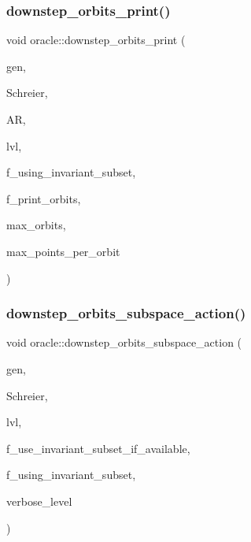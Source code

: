 \subsubsection{\texorpdfstring{downstep\+\_\+orbits\+\_\+print()}{downstep\_orbits\_print()}}
{\footnotesize\ttfamily void oracle\+::downstep\+\_\+orbits\+\_\+print (\begin{DoxyParamCaption}\item[{\mbox{\hyperlink{classgenerator}{generator}} $\ast$}]{gen,  }\item[{\mbox{\hyperlink{classschreier}{schreier}} \&}]{Schreier,  }\item[{\mbox{\hyperlink{classaction}{action}} \&}]{AR,  }\item[{\mbox{\hyperlink{galois_8h_a09fddde158a3a20bd2dcadb609de11dc}{I\+NT}}}]{lvl,  }\item[{\mbox{\hyperlink{galois_8h_a09fddde158a3a20bd2dcadb609de11dc}{I\+NT}}}]{f\+\_\+using\+\_\+invariant\+\_\+subset,  }\item[{\mbox{\hyperlink{galois_8h_a09fddde158a3a20bd2dcadb609de11dc}{I\+NT}}}]{f\+\_\+print\+\_\+orbits,  }\item[{\mbox{\hyperlink{galois_8h_a09fddde158a3a20bd2dcadb609de11dc}{I\+NT}}}]{max\+\_\+orbits,  }\item[{\mbox{\hyperlink{galois_8h_a09fddde158a3a20bd2dcadb609de11dc}{I\+NT}}}]{max\+\_\+points\+\_\+per\+\_\+orbit }\end{DoxyParamCaption})}

\mbox{\label{classoracle_adcf946d772e92646c47cf264764d85a6}} 
\subsubsection{\texorpdfstring{downstep\+\_\+orbits\+\_\+subspace\+\_\+action()}{downstep\_orbits\_subspace\_action()}}
{\footnotesize\ttfamily void oracle\+::downstep\+\_\+orbits\+\_\+subspace\+\_\+action (\begin{DoxyParamCaption}\item[{\mbox{\hyperlink{classgenerator}{generator}} $\ast$}]{gen,  }\item[{\mbox{\hyperlink{classschreier}{schreier}} \&}]{Schreier,  }\item[{\mbox{\hyperlink{galois_8h_a09fddde158a3a20bd2dcadb609de11dc}{I\+NT}}}]{lvl,  }\item[{\mbox{\hyperlink{galois_8h_a09fddde158a3a20bd2dcadb609de11dc}{I\+NT}}}]{f\+\_\+use\+\_\+invariant\+\_\+subset\+\_\+if\+\_\+available,  }\item[{\mbox{\hyperlink{galois_8h_a09fddde158a3a20bd2dcadb609de11dc}{I\+NT}} \&}]{f\+\_\+using\+\_\+invariant\+\_\+subset,  }\item[{\mbox{\hyperlink{galois_8h_a09fddde158a3a20bd2dcadb609de11dc}{I\+NT}}}]{verbose\+\_\+level }\end{DoxyParamCaption})}

